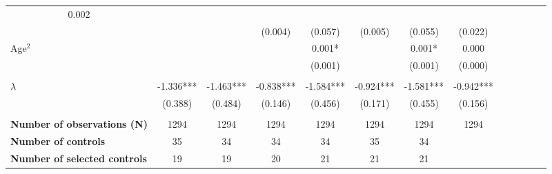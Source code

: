 \begin{center}
\begin{table}[th]
{\begin{tabular}{lcccccccccccc}
  \multicolumn{1}{c}{0.002} \\
\multicolumn{1}{l}{} &
  \multicolumn{1}{c}{} &
  \multicolumn{1}{c}{} &
  \multicolumn{1}{c}{(0.004)} &
  \multicolumn{1}{c}{(0.057)} &
  \multicolumn{1}{c}{(0.005)} &
  \multicolumn{1}{c}{(0.055)} &
  \multicolumn{1}{c}{(0.022)} \\
\multicolumn{1}{l}{Age$^2$} &
  \multicolumn{1}{c}{} &
  \multicolumn{1}{c}{} &
  \multicolumn{1}{c}{} &
  \multicolumn{1}{c}{0.001*} &
  \multicolumn{1}{c}{} &
  \multicolumn{1}{c}{0.001*} &
  \multicolumn{1}{c}{0.000} \\
\multicolumn{1}{l}{} &
  \multicolumn{1}{c}{} &
  \multicolumn{1}{c}{} &
  \multicolumn{1}{c}{} &
  \multicolumn{1}{c}{(0.001)} &
  \multicolumn{1}{c}{} &
  \multicolumn{1}{c}{(0.001)} &
  \multicolumn{1}{c}{(0.000)} \\
  \\
\multicolumn{1}{l}{$\lambda$} &
  \multicolumn{1}{c}{-1.336***} &
  \multicolumn{1}{c}{-1.463***} &
  \multicolumn{1}{c}{-0.838***} &
  \multicolumn{1}{c}{-1.584***} &
  \multicolumn{1}{c}{-0.924***} &
  \multicolumn{1}{c}{-1.581***} &
  \multicolumn{1}{c}{-0.942***} \\
\multicolumn{1}{l}{} &
  \multicolumn{1}{c}{(0.388)} &
  \multicolumn{1}{c}{(0.484)} &
  \multicolumn{1}{c}{(0.146)} &
  \multicolumn{1}{c}{(0.456)} &
  \multicolumn{1}{c}{(0.171)} &
  \multicolumn{1}{c}{(0.455)} &
  \multicolumn{1}{c}{(0.156)} \\
  \\
\multicolumn{1}{l}{{\bf Number of observations (N)}} &
  \multicolumn{1}{c}{1294} &
  \multicolumn{1}{c}{1294} &
  \multicolumn{1}{c}{1294} &
  \multicolumn{1}{c}{1294} &
  \multicolumn{1}{c}{1294} &
  \multicolumn{1}{c}{1294} &
  \multicolumn{1}{c}{1294} \\
\multicolumn{1}{l}{{\bf Number of controls}} &
  \multicolumn{1}{c}{35} &
  \multicolumn{1}{c}{34} &
  \multicolumn{1}{c}{34} &
  \multicolumn{1}{c}{34} &
  \multicolumn{1}{c}{35} &
  \multicolumn{1}{c}{34} &
  \multicolumn{1}{c}{} \\
\multicolumn{1}{l}{{\bf Number of selected controls}} &
  \multicolumn{1}{c}{19} &
  \multicolumn{1}{c}{19} &
  \multicolumn{1}{c}{20} &
  \multicolumn{1}{c}{21} &
  \multicolumn{1}{c}{21} &
  \multicolumn{1}{c}{21} &
  \multicolumn{1}{c}{} \\
\hline
\hline


\end{tabular}}
\end{table}
\end{center}
